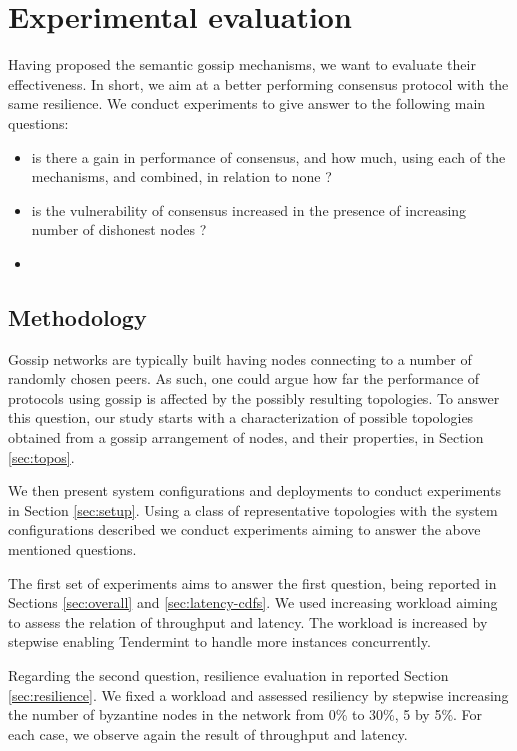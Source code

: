 \new
\section{Experimental evaluation}
\label{experiments}

Having proposed the semantic gossip mechanisms, we want to evaluate their effectiveness.  In short, we aim at a better performing consensus protocol with the same resilience.  We conduct experiments to give answer to the following main questions:
\begin{itemize}
\item is there a gain in performance of consensus, and how much, using each of the mechanisms, and combined, in relation to none ?
\item is the vulnerability of consensus increased in the presence of increasing number of dishonest nodes ?
\item {}
\end{itemize}

\subsection{Methodology}
\label{ref:method}

Gossip networks are typically built having nodes connecting to a number of randomly chosen peers.
As such, one could argue how far the performance of protocols using gossip is affected by the 
possibly resulting topologies.    To answer this question, our study starts with a characterization of possible topologies obtained from a gossip arrangement of nodes, and their properties, in Section \ref{sec:topos}.

We then present system configurations and deployments to conduct experiments in Section \ref{sec:setup}.
Using a class of representative topologies with the system configurations described we conduct experiments aiming to answer the above mentioned questions.

The first set of experiments aims to answer the first question, being
reported in Sections \ref{sec:overall} and \ref{sec:latency-cdfs}. 
We used increasing workload 
aiming to assess the relation of throughput and latency.
The workload is increased by stepwise enabling Tendermint to handle more 
instances concurrently.

Regarding the second question, resilience evaluation in reported Section \ref{sec:resilience}.  
We fixed a workload and assessed resiliency by 
stepwise increasing the number of byzantine nodes in the network from 0\% to 30\%, 5 by 5\%.   For each case, we observe again the result of throughput and latency.

